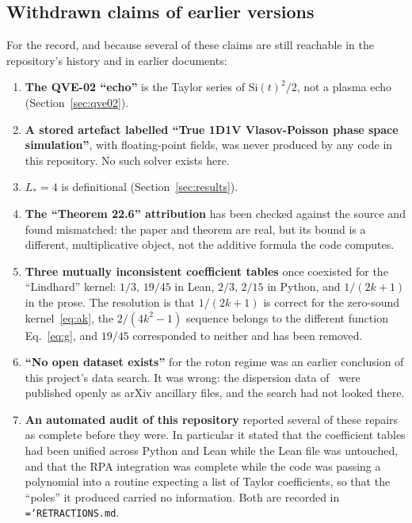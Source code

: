 \documentclass[11pt,a4paper]{article}
\newcommand{\code}[1]{\texttt{\hyphenchar\font=`\-\relax #1}}
\begin{document}
\subsection{Withdrawn claims of earlier versions}

For the record, and because several of these claims are still reachable in the
repository's history and in earlier documents:

\begin{enumerate}
  \item \textbf{The QVE-02 ``echo''} is the Taylor series of
        $\mathrm{Si}(t)^{2}/2$, not a plasma echo (Section~\ref{sec:qve02}).
  \item \textbf{A stored artefact labelled ``True 1D1V Vlasov-Poisson phase
        space simulation''}, with floating-point fields, was never produced by
        any code in this repository. No such solver exists here.
  \item \textbf{$L_*=4$} is definitional (Section~\ref{sec:results}).
  \item \textbf{The ``Theorem 22.6'' attribution} has been checked against the
        source and found mismatched: the paper and theorem are real, but its
        bound is a different, multiplicative object, not the additive formula
        the code computes.
  \item \textbf{Three mutually inconsistent coefficient tables} once coexisted
        for the ``Lindhard'' kernel: $1/3,\,19/45$ in Lean, $2/3,\,2/15$ in
        Python, and $1/(2k+1)$ in the prose. The resolution is that
        $1/(2k+1)$ is correct for the zero-sound kernel~\eqref{eq:ak}, the
        $2/(4k^{2}-1)$ sequence belongs to the different function
        Eq.~\eqref{eq:g}, and $19/45$ corresponded to neither and has been
        removed.
  \item \textbf{``No open dataset exists''} for the roton regime was an earlier conclusion of
        this project's data search. It was wrong: the dispersion data of~\cite{godfrin2021}
        were published openly as arXiv ancillary files, and the search had not looked there.
  \item \textbf{An automated audit of this repository} reported several of these
        repairs as complete before they were. In particular it stated that the
        coefficient tables had been unified across Python and Lean while the
        Lean file was untouched, and that the RPA integration was complete while
        the code was passing a polynomial into a routine expecting a list of
        Taylor coefficients, so that the ``poles'' it produced carried no
        information. Both are recorded in \code{RETRACTIONS.md}.
\end{enumerate}
\end{document}
